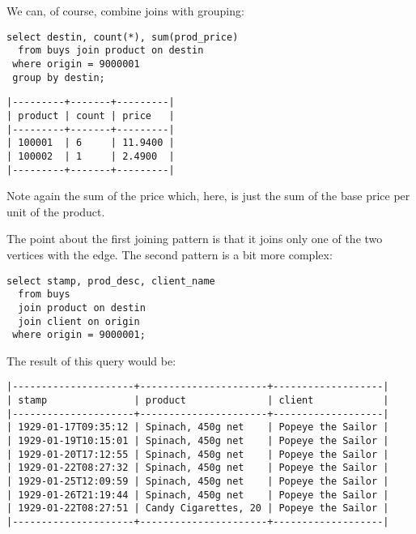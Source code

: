 We can, of course, combine joins with grouping:

\begin{sqlcode}
\begin{lstlisting}
select destin, count(*), sum(prod_price)
  from buys join product on destin
 where origin = 9000001
 group by destin;
\end{lstlisting}
\end{sqlcode}

\begin{minipage}{\textwidth}
\begin{verbatim}
|---------+-------+---------|
| product | count | price   |
|---------+-------+---------|
| 100001  | 6     | 11.9400 |
| 100002  | 1     | 2.4900  |
|---------+-------+---------|
\end{verbatim}
\end{minipage}

Note again the sum of the price which, here,
is just the sum of the base price per unit of the product.

The point about the first joining pattern
is that it joins only one of the two vertices
with the edge. The second pattern is a bit more complex:

\begin{sqlcode}
\begin{lstlisting}
select stamp, prod_desc, client_name
  from buys
  join product on destin
  join client on origin
 where origin = 9000001;
\end{lstlisting}
\end{sqlcode}

The result of this query would be:

\begin{minipage}{\textwidth}
\begin{verbatim}
|---------------------+----------------------+-------------------|
| stamp               | product              | client            |
|---------------------+----------------------+-------------------|
| 1929-01-17T09:35:12 | Spinach, 450g net    | Popeye the Sailor |
| 1929-01-19T10:15:01 | Spinach, 450g net    | Popeye the Sailor |
| 1929-01-20T17:12:55 | Spinach, 450g net    | Popeye the Sailor |
| 1929-01-22T08:27:32 | Spinach, 450g net    | Popeye the Sailor |
| 1929-01-25T12:09:59 | Spinach, 450g net    | Popeye the Sailor |
| 1929-01-26T21:19:44 | Spinach, 450g net    | Popeye the Sailor |
| 1929-01-22T08:27:51 | Candy Cigarettes, 20 | Popeye the Sailor |
|---------------------+----------------------+-------------------|
\end{verbatim}
\end{minipage}

